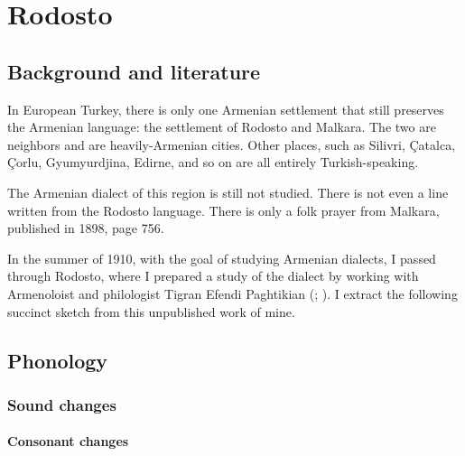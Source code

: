 

\chapter{Rodosto}\label{chapter:Rodosto}

\section{Background and literature}

\begin{adjarianpage}\label{page:258}\end{adjarianpage}%

In European Turkey, there is only one Armenian settlement that still preserves the Armenian language: the settlement of Rodosto and Malkara. The two are neighbors and are heavily-Armenian cities. Other places, such as Silivri, Çatalca, Çorlu, Gyumyurdjina, Edirne, and so on are all entirely Turkish-speaking.


The Armenian dialect of this region is still not studied. There is not even a line written from the Rodosto language. There is only a folk prayer from Malkara, published in  1898, page 756. 

In the summer of 1910, with the goal of studying Armenian dialects, I passed through Rodosto, where I prepared a study of the dialect by working with Armenoloist and philologist Tigran Efendi Paghtikian (; ). I extract the following succinct sketch from this unpublished work of mine. 

\section{Phonology}
\subsection{Sound changes}
\subsubsection{Consonant changes}
